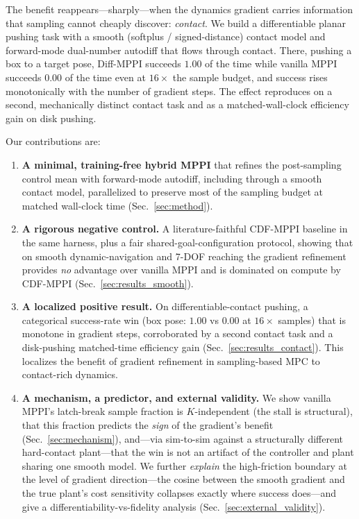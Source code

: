 \documentclass[journal]{IEEEtran}
\begin{document}
The benefit reappears---sharply---when the dynamics gradient carries information
that sampling cannot cheaply discover: \emph{contact}. We build a differentiable
planar pushing task with a smooth (softplus / signed-distance) contact model and
forward-mode dual-number autodiff that flows through contact. There, pushing a
box to a target pose, Diff-MPPI succeeds $1.00$ of the time while vanilla MPPI
succeeds $0.00$ of the time even at $16\times$ the sample budget, and success
rises monotonically with the number of gradient steps. The effect reproduces on
a second, mechanically distinct contact task and as a matched-wall-clock
efficiency gain on disk pushing.

Our contributions are:
\begin{enumerate}
  \item \textbf{A minimal, training-free hybrid MPPI} that refines the
    post-sampling control mean with forward-mode autodiff, including through a
    smooth contact model, parallelized to preserve most of the sampling budget
    at matched wall-clock time (Sec.~\ref{sec:method}).
  \item \textbf{A rigorous negative control.} A literature-faithful CDF-MPPI
    baseline in the same harness, plus a fair shared-goal-configuration
    protocol, showing that on smooth dynamic-navigation and 7-DOF reaching the
    gradient refinement provides \emph{no} advantage over vanilla MPPI and is
    dominated on compute by CDF-MPPI (Sec.~\ref{sec:results_smooth}).
  \item \textbf{A localized positive result.} On differentiable-contact pushing,
    a categorical success-rate win (box pose: $1.00$ vs $0.00$ at $16\times$
    samples) that is monotone in gradient steps, corroborated by a second
    contact task and a disk-pushing matched-time efficiency gain
    (Sec.~\ref{sec:results_contact}). This localizes the benefit of gradient
    refinement in sampling-based MPC to contact-rich dynamics.
  \item \textbf{A mechanism, a predictor, and external validity.} We show vanilla
    MPPI's latch-break sample fraction is $K$-independent (the stall is structural),
    that this fraction predicts the \emph{sign} of the gradient's benefit
    (Sec.~\ref{sec:mechanism}), and---via sim-to-sim against a structurally different
    hard-contact plant---that the win is not an artifact of the controller and plant
    sharing one smooth model. We further \emph{explain} the high-friction boundary at
    the level of gradient direction---the cosine between the smooth gradient and the
    true plant's cost sensitivity collapses exactly where success does---and give a
    differentiability-vs-fidelity analysis (Sec.~\ref{sec:external_validity}).
\end{enumerate}
\end{document}
